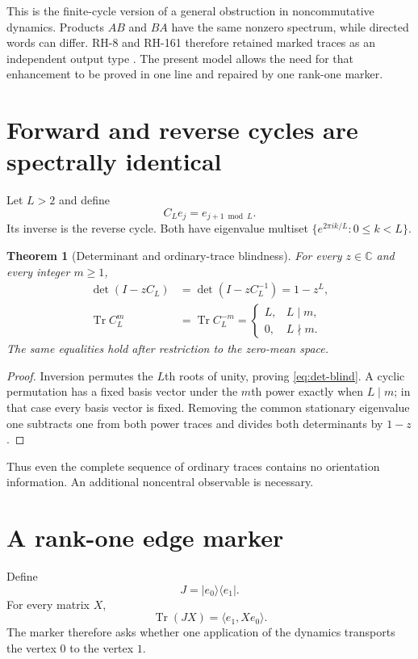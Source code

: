 \documentclass[12pt]{article}
\newtheorem{theorem}{Theorem}[section]
\theoremstyle{remark}
\newcommand{\Tr}{\operatorname{Tr}}
\begin{document}
This is the finite-cycle version of a general obstruction in noncommutative
dynamics.  Products $AB$ and $BA$ have the same nonzero spectrum, while
directed words can differ.  RH-8 and RH-161 therefore retained marked traces
as an independent output type \citep{WangRH8,WangRH161}.  The present model
allows the need for that enhancement to be proved in one line and repaired by
one rank-one marker.

\section{Forward and reverse cycles are spectrally identical}

Let $L>2$ and define
\[
 C_Le_j=e_{j+1\bmod L}.
\]
Its inverse is the reverse cycle.  Both have eigenvalue multiset
$\{e^{2\pi ik/L}:0\le k<L\}$.

\begin{theorem}[Determinant and ordinary-trace blindness]\label{thm:blind}
For every $z\in\mathbb C$ and every integer $m\ge1$,
\begin{align}
 \det(I-zC_L)&=\det(I-zC_L^{-1})=1-z^L,
 \label{eq:det-blind}\\
 \Tr C_L^m&=\Tr C_L^{-m}
 =\begin{cases}L,&L\mid m,\\0,&L\nmid m.
 \end{cases}
 \label{eq:trace-blind}
\end{align}
The same equalities hold after restriction to the zero-mean space.
\end{theorem}

\begin{proof}
Inversion permutes the $L$th roots of unity, proving
\eqref{eq:det-blind}.  A cyclic permutation has a fixed basis vector under
the $m$th power exactly when $L\mid m$; in that case every basis vector is
fixed.  Removing the common stationary eigenvalue one subtracts one from both
power traces and divides both determinants by $1-z$.
\end{proof}

Thus even the complete sequence of ordinary traces contains no orientation
information.  An additional noncentral observable is necessary.

\section{A rank-one edge marker}

Define
\begin{equation}\label{eq:J}
 J=|e_0\rangle\langle e_1|.
\end{equation}
For every matrix $X$,
\[
 \Tr(JX)=\langle e_1,Xe_0\rangle.
\]
The marker therefore asks whether one application of the dynamics transports
the vertex $0$ to the vertex $1$.
\end{document}
